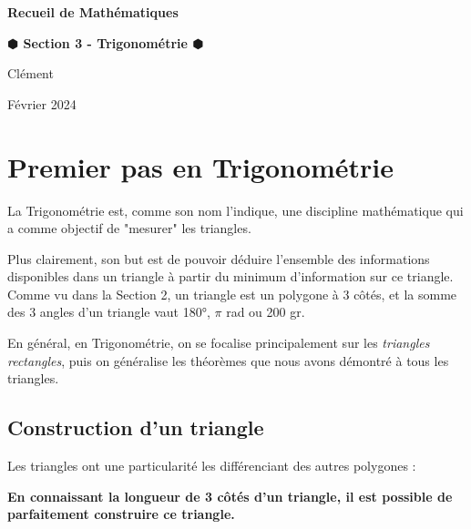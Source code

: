 \documentclass[a4paper]{article}
\begin{document}
	\begin{titlepage}
		\begin{center}
		
			\Huge	 \textbf{Recueil de Mathématiques}\\
			\bigskip \smallskip
		
			\Large	 \textbf{$\varhexagonblack$ Section 3 - Trigonométrie $\varhexagonblack$}\\
			\bigskip
		
			\large	 Clément   \\ 
			\smallskip
		
			\normalfont Février 2024 \\
		
		\end{center}
		
		\doublespacing
		\tableofcontents
		\singlespacing

	\end{titlepage}





	\section{Premier pas en Trigonométrie}

		La Trigonométrie est, comme son nom l'indique, une discipline mathématique qui a comme objectif de "mesurer" les triangles.

		Plus clairement, son but est de pouvoir déduire l'ensemble des informations disponibles dans un 
		triangle à partir du minimum d'information sur ce triangle.
		Comme vu dans la Section 2, un triangle est un polygone à 3 côtés, 
		et la somme des 3 angles d'un triangle vaut 180°, $\pi$ rad ou 200 gr.

		En général, en Trigonométrie, on se focalise principalement sur les \textit{triangles rectangles}, 
		puis on généralise les théorèmes que nous avons démontré à tous les triangles.

		\subsection{Construction d'un triangle}
	
			Les triangles ont une particularité les différenciant des autres polygones :

			\textbf{En connaissant la longueur de 3 côtés d'un triangle, il est possible de parfaitement construire ce triangle.}
\end{document}
